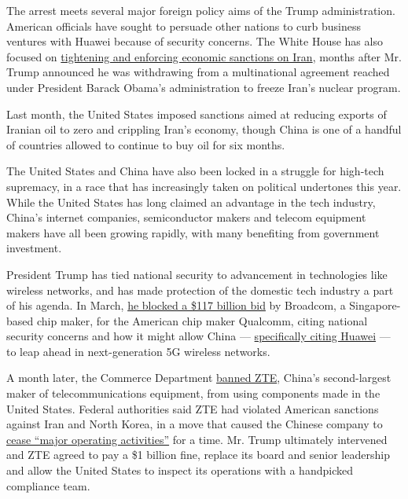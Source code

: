 The arrest meets several major foreign policy aims of the Trump
administration. American officials have sought to persuade other nations
to curb business ventures with Huawei because of security concerns. The
White House has also focused on
\href{https://www.nytimes.com/2018/11/09/sunday-review/trump-sanctions-iran-foreign-policy.html}{tightening
and enforcing economic sanctions on Iran}, months after Mr. Trump
announced he was withdrawing from a multinational agreement reached
under President Barack Obama's administration to freeze Iran's nuclear
program.

Last month, the United States imposed sanctions aimed at reducing
exports of Iranian oil to zero and crippling Iran's economy, though
China is one of a handful of countries allowed to continue to buy oil
for six months.

The United States and China have also been locked in a struggle for
high-tech supremacy, in a race that has increasingly taken on political
undertones this year. While the United States has long claimed an
advantage in the tech industry, China's internet companies,
semiconductor makers and telecom equipment makers have all been growing
rapidly, with many benefiting from government investment.

President Trump has tied national security to advancement in
technologies like wireless networks, and has made protection of the
domestic tech industry a part of his agenda. In March,
\href{https://www.nytimes.com/2018/03/12/technology/trump-broadcom-qualcomm-merger.html}{he
blocked a \$117 billion bid} by Broadcom, a Singapore-based chip maker,
for the American chip maker Qualcomm, citing national security concerns
and how it might allow China ---
\href{https://www.nytimes.com/2018/03/06/business/qualcomm-broadcom-cfius.html}{specifically
citing Huawei} --- to leap ahead in next-generation 5G wireless
networks.

A month later, the Commerce Department
\href{https://www.nytimes.com/2018/04/16/technology/chinese-tech-company-blocked-from-buying-american-components.html?module=inline}{banned
ZTE}, China's second-largest maker of telecommunications equipment, from
using components made in the United States. Federal authorities said ZTE
had violated American sanctions against Iran and North Korea, in a move
that caused the Chinese company to
\href{https://www.nytimes.com/2018/05/09/technology/zte-china-us-trade-war.html}{cease
``major operating activities''} for a time. Mr. Trump ultimately
intervened and ZTE agreed to pay a \$1 billion fine, replace its board
and senior leadership and allow the United States to inspect its
operations with a handpicked compliance team.

